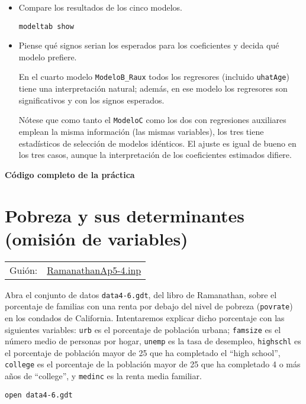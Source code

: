 \documentclass[11pt]{article}
\begin{document}
\begin{itemize}
\item Compare los resultados de los cinco modelos.
{\vspace{0pt} \color{gray!70!black}
\begin{verbatim}
modeltab show
\end{verbatim}
}

\item Piense qué signos serian los esperados para los coeficientes y
decida qué modelo prefiere.

{\color{gray!90!black} \small
En el cuarto modelo \texttt{ModeloB\_Raux} todos los regresores
(incluido \texttt{uhatAge}) tiene una interpretación natural;
además, en ese modelo los regresores son significativos y con los
signos esperados.

Nótese que como tanto el \texttt{ModeloC} como los dos con
regresiones auxiliares emplean la misma información (las mismas
variables), los tres tiene estadísticos de selección de modelos
idénticos. El ajuste es igual de bueno en los tres casos, aunque la
interpretación de los coeficientes estimados difiere.
}
\end{itemize}

\clearpage
\vspace{10pt}
\noindent
\textbf{Código completo de la práctica}
\vspace{10pt}

\clearpage


\section{Pobreza y sus determinantes (omisión de variables)}
\label{sec:org26d1b09}
\begin{center}
\begin{tabular}{ll}
Guión: & \href{https://github.com/mbujosab/Ectr/tree/master/Practicas/Gretl/scripts/RamanathanAp5-4.inp}{RamanathanAp5-4.inp}\\
\end{tabular}
\end{center}

Abra el conjunto de datos \texttt{data4-6.gdt}, del libro de Ramanathan,
sobre el porcentaje de familias con una renta por debajo del nivel de
pobreza (\texttt{povrate}) en los condados de California. Intentaremos
explicar dicho porcentaje con las siguientes variables: \texttt{urb} es el
porcentaje de población urbana; \texttt{famsize} es el número medio de
personas por hogar, \texttt{unemp} es la tasa de desempleo, \texttt{highschl} es el
porcentaje de población mayor de 25 que ha completado el ``high
school'', \texttt{college} es el porcentaje de la población mayor de 25 que
ha completado 4 o más años de ``college'', y \texttt{medinc} es la renta
media familiar.
{\vspace{0pt} \color{gray!70!black}
\begin{verbatim}
open data4-6.gdt
\end{verbatim}
}
\end{document}
